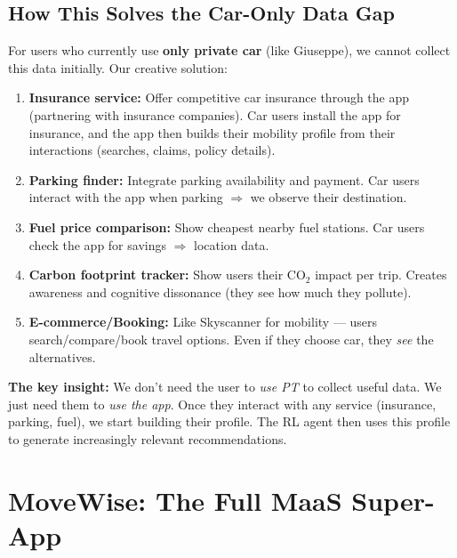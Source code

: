 \documentclass[11pt,a4paper]{article}
\begin{document}
\subsection{How This Solves the Car-Only Data Gap}

For users who currently use \textbf{only private car} (like Giuseppe), we cannot collect this data initially. Our creative solution:

\begin{tcolorbox}[colback=lightgreen,colframe=deepgreen,title=\textbf{Strategy: Attract Car Users into the App via Additional Services}]
\begin{enumerate}[noitemsep]
    \item \textbf{Insurance service:} Offer competitive car insurance through the app (partnering with insurance companies). Car users install the app for insurance, and the app then builds their mobility profile from their interactions (searches, claims, policy details).
    \item \textbf{Parking finder:} Integrate parking availability and payment. Car users interact with the app when parking $\Rightarrow$ we observe their destination.
    \item \textbf{Fuel price comparison:} Show cheapest nearby fuel stations. Car users check the app for savings $\Rightarrow$ location data.
    \item \textbf{Carbon footprint tracker:} Show users their CO$_2$ impact per trip. Creates awareness and cognitive dissonance (they see how much they pollute).
    \item \textbf{E-commerce/Booking:} Like Skyscanner for mobility --- users search/compare/book travel options. Even if they choose car, they \textit{see} the alternatives.
\end{enumerate}
\end{tcolorbox}

\textbf{The key insight:} We don't need the user to \textit{use PT} to collect useful data. We just need them to \textit{use the app}. Once they interact with any service (insurance, parking, fuel), we start building their profile. The RL agent then uses this profile to generate increasingly relevant recommendations.

\section{MoveWise: The Full MaaS Super-App}
\label{sec:app}
\end{document}
